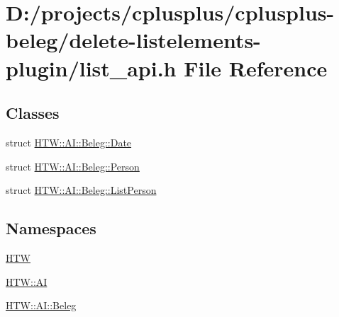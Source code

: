 \hypertarget{delete-listelements-plugin_2list__api_8h}{\section{D\-:/projects/cplusplus/cplusplus-\/beleg/delete-\/listelements-\/plugin/list\-\_\-api.h File Reference}
\label{delete-listelements-plugin_2list__api_8h}
}
\subsection*{Classes}
\begin{DoxyCompactItemize}
\item 
struct \hyperlink{struct_h_t_w_1_1_a_i_1_1_beleg_1_1_date}{H\-T\-W\-::\-A\-I\-::\-Beleg\-::\-Date}
\item 
struct \hyperlink{struct_h_t_w_1_1_a_i_1_1_beleg_1_1_person}{H\-T\-W\-::\-A\-I\-::\-Beleg\-::\-Person}
\item 
struct \hyperlink{struct_h_t_w_1_1_a_i_1_1_beleg_1_1_list_person}{H\-T\-W\-::\-A\-I\-::\-Beleg\-::\-List\-Person}
\end{DoxyCompactItemize}
\subsection*{Namespaces}
\begin{DoxyCompactItemize}
\item 
\hyperlink{namespace_h_t_w}{H\-T\-W}
\item 
\hyperlink{namespace_h_t_w_1_1_a_i}{H\-T\-W\-::\-A\-I}
\item 
\hyperlink{namespace_h_t_w_1_1_a_i_1_1_beleg}{H\-T\-W\-::\-A\-I\-::\-Beleg}
\end{DoxyCompactItemize}
